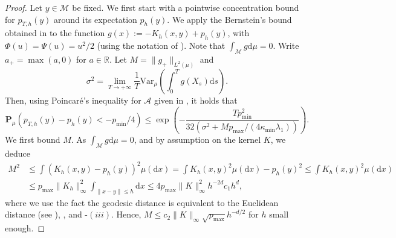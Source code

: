 \documentclass[10pt,a4paper]{article}
\renewcommand{\P}{{\mathbf P}}
\newcommand{\R}{{\mathbb R}}
\newcommand\cA{\mathcal{A}}
\newcommand\cM{\mathcal{M}}
\newcommand\dd{\mathrm{d}}
\newcommand{\PAR}[1]{{{\left(#1\right)}}} %
\begin{document}
	\begin{proof}
Let $y\in\cM$ be fixed.	 We first start with a pointwise concentration bound for $p_{T,h}(y)$ around its expectation $p_h(y)$. We apply the Bernstein's bound obtained in \cite[Theorem 3.5]{gao2014bernstein} to the function $g(x):=-K_h\PAR{x,y}+p_h(y)$, with $\Phi(u)=\Psi(u)=u^2/2$ (using the notation of \cite{gao2014bernstein}). Note that $\int_{\cM}g\dd \mu=0$. Write $a_+=\max(a,0)$ for $a\in \R$. Let $M= \|g_+\|_{L^2(\mu)}$ and
\[
 \sigma^2=\lim_{T\to +\infty}\frac{1}{T}\mathrm{Var}_{\mu}\PAR{\int_0^T g(X_s)\dd s}.
 \]
Then, using Poincaré's inequality for $\cA$ given in , it holds that 
\begin{equation}\label{etape:Bernstein}
\P_{\mu}\PAR{ p_{T,h}(y)-p_h(y) <-p_{\min}/4} \le \exp\PAR{-\frac{T p_{\min}^2}{32(\sigma^2+Mp_{\max}/(4\kappa_{\min}\lambda_1))}}.\end{equation}
We first bound $M$. 
     As $\int_{\cM}g\dd \mu=0$, and by assumption on the kernel $K$, we deduce
\begin{align*}
M^2&\le  \int (K_h(x,y)-p_h(y))^2\mu(\dd x)=\int K_h(x,y)^2\mu(\dd x)-p_h(y)^2\le \int K_h(x,y)^2\mu(\dd x)\\
&\le p_{\max}\|K_h\|_\infty^2 \int_{\|x-y\|\le h}\dd x\le  4p_{\max}\|K\|_\infty^2 h^{-2d} c_1h^d,
\end{align*}
where we use the fact the geodesic distance is equivalent to the Euclidean distance (see \cite[Proposition 2]{Trillos2020}), , and -$(iii)$.
    Hence, $M\le c_2\|K\|_\infty \sqrt{p_{\max}} h^{-d/2}$ for $h$ small enough.
    

\end{proof}
\end{document}
